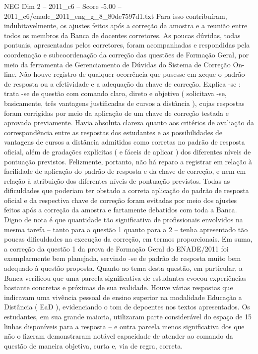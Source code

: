 \begin{textsample}{NEG Dim 2 – 2011\_c6 – Score -5.00 – 2011\_c6/enade\_2011\_eng\_g\_8\_80de7597d1.txt}
Para isso contribuíram, indubitavelmente, os ajustes feitos após a correção da amostra e a reunião entre todos os membros da Banca de docentes corretores.
As poucas dúvidas, todas pontuais, apresentadas pelos corretores, foram acompanhadas e respondidas pela coordenação e subcoordenação da correção das questões de Formação Geral, por meio da ferramenta de Gerenciamento de Dúvidas do Sistema de Correção On-line.
Não houve registro de qualquer ocorrência que pusesse em xeque o padrão de resposta ou a efetividade e a adequação da chave de correção.
Explica -se : trata -se de questão com comando claro, direto e objetivo ( solicitava -se, basicamente, três vantagens justificadas de cursos a distância ), cujas respostas foram corrigidas por meio da aplicação de um chave de correção testada e aprovada previamente.
Havia absoluta clareza quanto aos critérios de avaliação da correspondência entre as respostas dos estudantes e as possibilidades de vantagens de cursos a distância admitidas como corretas no padrão de resposta oficial, além de gradações explícitas ( e fáceis de aplicar ) dos diferentes níveis de pontuação previstos.
Felizmente, portanto, não há reparo a registrar em relação à facilidade de aplicação do padrão de resposta e da chave de correção, e nem em relação à atribuição dos diferentes níveis de pontuação previstos.
Todas as dificuldades que poderiam ter obstado a correta aplicação do padrão de resposta oficial e da respectiva chave de correção foram evitadas por meio dos ajustes feitos após a correção da amostra e fartamente debatidos com toda a Banca.
Digno de nota é que quantidade tão significativa de profissionais envolvidos na mesma tarefa – tanto para a questão 1 quanto para a 2 – tenha apresentado tão poucas dificuldades na execução da correção, em termos proporcionais.
Em suma, a correção da questão 1 da prova de Formação Geral do ENADE/2011 foi exemplarmente bem planejada, servindo -se de padrão de resposta muito bem adequado à questão proposta.
Quanto ao tema desta questão, em particular, a Banca verificou que uma parcela significativa de estudantes evocou experiências bastante concretas e próximas de sua realidade.
Houve várias respostas que indicavam uma vivência pessoal de ensino superior na modalidade Educação a Distância ( EaD ), evidenciando o tom de depoentes nos textos apresentados.
Os estudantes, em sua grande maioria, utilizaram parte considerável do espaço de 15 linhas disponíveis para a resposta – e outra parcela menos significativa dos que não o fizeram demonstraram notável capacidade de atender ao comando da questão de maneira objetiva, curta e, via de regra, correta.

\end{textsample}
